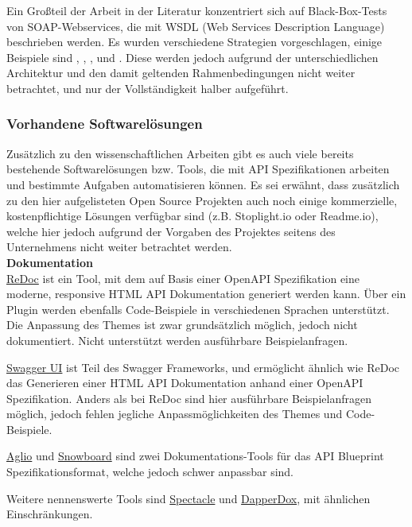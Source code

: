 Ein Großteil der Arbeit in der Literatur konzentriert sich auf Black-Box-Tests von SOAP-Webservices, die mit WSDL (Web Services Description Language) beschrieben werden. Es wurden verschiedene Strategien vorgeschlagen, einige Beispiele sind \textcite{xu2005testing}, \textcite{bai2005wsdl}, \textcite{martin2006automated}, \textcite{ma2008wsdl} und \textcite{bartolini2009ws}. Diese werden jedoch aufgrund der unterschiedlichen Architektur und den damit geltenden Rahmenbedingungen nicht weiter betrachtet, und nur der Vollständigkeit halber aufgeführt.


\subsubsection{Vorhandene Softwarelösungen}

Zusätzlich zu den wissenschaftlichen Arbeiten gibt es auch viele bereits bestehende Softwarelösungen bzw. Tools, die mit API Spezifikationen arbeiten und bestimmte Aufgaben automatisieren können. Es sei erwähnt, dass zusätzlich zu den hier aufgelisteten Open Source Projekten auch noch einige kommerzielle, kostenpflichtige Lösungen verfügbar sind (z.B. Stoplight.io oder Readme.io), welche hier jedoch aufgrund der Vorgaben des Projektes seitens des Unternehmens nicht weiter betrachtet werden.\\

\textbf{Dokumentation}\\
\href{https://github.com/Rebilly/ReDoc}{ReDoc} ist ein Tool, mit dem auf Basis einer OpenAPI Spezifikation eine moderne, responsive HTML API Dokumentation generiert werden kann. Über ein Plugin werden ebenfalls Code-Beispiele in verschiedenen Sprachen unterstützt. Die Anpassung des Themes ist zwar grundsätzlich möglich, jedoch nicht dokumentiert. Nicht unterstützt werden ausführbare Beispielanfragen.

\href{https://swagger.io/tools/swagger-ui/}{Swagger UI} ist Teil des Swagger Frameworks, und ermöglicht ähnlich wie ReDoc das Generieren einer HTML API Dokumentation anhand einer OpenAPI Spezifikation. Anders als bei ReDoc sind hier ausführbare Beispielanfragen möglich, jedoch fehlen jegliche Anpassmöglichkeiten des Themes und Code-Beispiele.

\href{https://github.com/danielgtaylor/aglio}{Aglio} und \href{https://github.com/subosito/snowboard}{Snowboard} sind zwei Dokumentations-Tools für das API Blueprint Spezifikationsformat, welche jedoch schwer anpassbar sind.

Weitere nennenswerte Tools sind \href{https://github.com/sourcey/spectacle}{Spectacle} und \href{http://dapperdox.io/}{DapperDox}, mit ähnlichen Einschränkungen.\\

